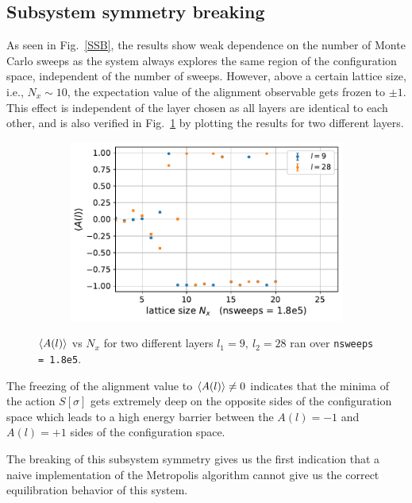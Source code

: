 \documentclass[../thesis_main.tex]{subfiles}
\begin{document}
\subsection{Subsystem symmetry breaking}
As seen in Fig.~\ref{SSB}, the results show weak dependence on the number of Monte Carlo sweeps as the system always explores the same region of the configuration space, independent of the number of sweeps. However, above a certain lattice size, i.e., $N_x \sim 10$, the expectation value of the alignment observable gets frozen to $\pm 1$. This effect is independent of the layer chosen as all layers are identical to each other, and is also verified in Fig.~\ref{differentlayer_sameMCsweeps} by plotting the results for two different layers.
\begin{figure}[!htb]
    \centering
    \begin{subfigure}[b]{0.5\textwidth}
        \centering
        \includegraphics[width=\textwidth]{images/expval(A_l)_vs_N_x/A vs N_x (nsweeps=1.8e5).pdf}
    \end{subfigure}
    \caption{$\expval{A(l)}$ vs $N_x$ for two different layers $l_1 = 9,\: l_2 = 28$ ran over \texttt{nsweeps = 1.8e5}.}
    \label{differentlayer_sameMCsweeps}
\end{figure}
\FloatBarrier
The freezing of the alignment value to $\expval{A(l)} \neq 0$ indicates that the minima of the action $S[\sigma]$ gets extremely deep on the opposite sides of the configuration space which leads to a high energy barrier between the $A(l)= - 1$ and $A(l) = +1$ sides of the configuration space.

The breaking of this subsystem symmetry gives us the first indication that a naive implementation of the Metropolis algorithm cannot give us the correct equilibration behavior of this system.
\end{document}
